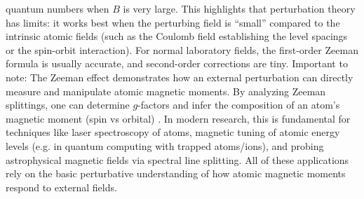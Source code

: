 \documentclass[12pt]{article}
\begin{document}
quantum numbers when $B$ is very large. This highlights that perturbation theory has limits: it works best when the perturbing field is “small” compared to the intrinsic atomic fields (such as the Coulomb field establishing the level spacings or the spin-orbit interaction). For normal laboratory fields, the first-order Zeeman formula is usually accurate, and second-order corrections are tiny. Important to note: The Zeeman effect demonstrates how an external perturbation can directly measure and manipulate atomic magnetic moments. By analyzing Zeeman splittings, one can determine $g$-factors and infer the composition of an atom’s magnetic moment (spin vs orbital) \cite{ZeemanUT}. In modern research, this is fundamental for techniques like laser spectroscopy of atoms, magnetic tuning of atomic energy levels (e.g. in quantum computing with trapped atoms/ions), and probing astrophysical magnetic fields via spectral line splitting. All of these applications rely on the basic perturbative understanding of how atomic magnetic moments respond to external fields.

\printbibliography    
\end{document}
